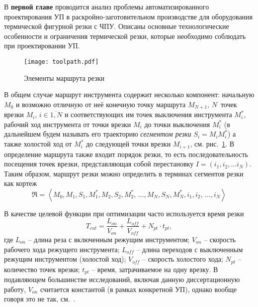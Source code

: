 
В {\bf первой главе}
проводится анализ проблемы автоматизированного проектирования УП
в раскройно-заготовительном производстве для оборудования термической фигурной резки с ЧПУ.
Описаны основные технологические особенности и ограничения термической резки,
которые необходимо соблюдать при проектировании УП.

\begin{figure}[h]
  \centering
  \texttt{[image: toolpath.pdf]}
  \caption{Элементы маршрута резки}
  \label{fig:toolpath}
\end{figure}

В общем случае маршрут инструмента содержит несколько компонент:
начальную $M_0$
и возможно отличную от неё конечную точку маршрута $M_{N+1}$,
$N$~точек врезки $M_i$, $i \in \overline{1, N}$
и соответствующих им точек выключения инструмента
$M_i^*$,
рабочий ход инструмента от точки врезки $M_i$
до точки выключения $M_i^*$
(в дальнейшем будем называть его траекторию
{\it сегментом резки}
$S_i=M_i M_i^*$)
а также холостой ход от $M_i^*$
до следующей точки врезки $M_{i+1}$,
см. рис.~\ref{fig:toolpath}.
В определение маршрута также входит
порядок резки,
то есть последовательность посещения точек врезки,
представляющая собой перестановку
$I = (i_1, i_2, ... i_N)$.
Таким образом,
маршрут резки можно определить
в терминах сегментов резки как кортеж
\begin{equation}
  \mathfrak{R} = \left<
    M_0, M_1, S_1, M_1^*, M_2, S_2, M_2^*, \,\dots, M_N, S_N, M_N^*,
    i_1, i_2, \,\dots, i_N
  \right>
  \label{eq:route:tuple}
\end{equation}

В качестве целевой функции при оптимизации часто используется время резки
\begin{equation}
  T_{cut} = \frac{L_{on}}{V_{on}} + \frac{L_{off}}{V_{off}} +N_{pt} \cdot t_{pt}
  ,
  \label{eq:cutting-time}
\end{equation}
где
$L_{on}$ -- длина реза с включенным режущим инструментом;
$V_{on}$ -- скорость рабочего хода режущего инструмента;
$L_{off}$ -- длина переходов с выключенным режущим инструментом (холостой ход);
$V_{off}$ -- скорость холостого хода;
$N_{pt}$ -- количество точек врезки;
$t_{pt}$ -- время, затрачиваемое на одну врезку.
В подавляющем большинстве исследований,
включая данную диссертационную работу,
$V_{on}$ считается константой
(в рамках конкретной УП),
однако вообще говоря это не так,
см.~\cite{Obuhovo}.


